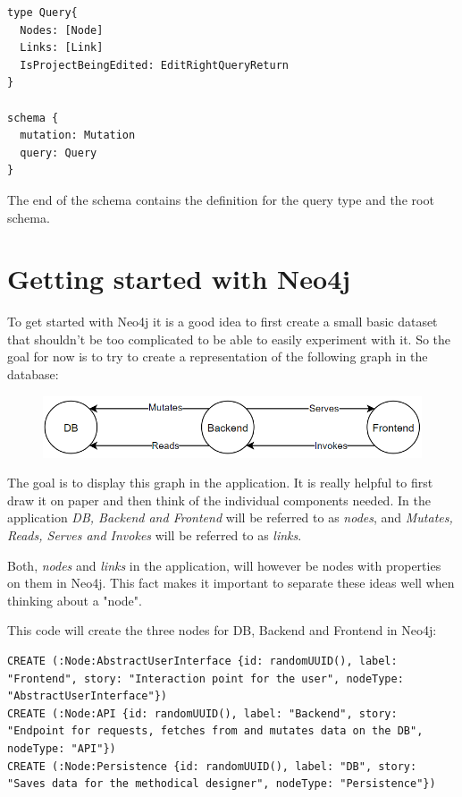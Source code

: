 \begin{lstlisting}[caption={Root Type Definitions}]
type Query{
  Nodes: [Node]
  Links: [Link]
  IsProjectBeingEdited: EditRightQueryReturn
}

schema {
  mutation: Mutation
  query: Query
}
\end{lstlisting}

The end of the schema contains the definition for the query type and the root schema.

\section{Getting started with Neo4j}
\label{chap:StartNeo}
To get started with Neo4j it is a good idea to first create a small basic dataset that shouldn't be too complicated to be able to easily experiment with it. So the goal for now is to try to create a representation of the following graph in the database:

\begin{figure}[H]
\centering
\includegraphics[scale=.8]{Bilder/BasicGraph.png}
\label{ex421}
\end{figure}

The goal is to display this graph in the application. It is really helpful to first draw it on paper and then think of the individual components needed. In the application \emph{DB, Backend and Frontend} will be referred to as \emph{nodes}, and \emph{Mutates, Reads, Serves and Invokes} will be referred to as \emph{links}.

Both, \emph{nodes} and \emph{links} in the application, will however be nodes with properties on them in Neo4j. This fact makes it important to separate these ideas well when thinking about a "node".

This code will create the three nodes for DB, Backend and Frontend in Neo4j:
\lstset{language=Cypher}
\begin{lstlisting}[caption={Cypher Statements to Create the Nodes}]
CREATE (:Node:AbstractUserInterface {id: randomUUID(), label: "Frontend", story: "Interaction point for the user", nodeType: "AbstractUserInterface"})
CREATE (:Node:API {id: randomUUID(), label: "Backend", story: "Endpoint for requests, fetches from and mutates data on the DB", nodeType: "API"})
CREATE (:Node:Persistence {id: randomUUID(), label: "DB", story: "Saves data for the methodical designer", nodeType: "Persistence"})
\end{lstlisting}

